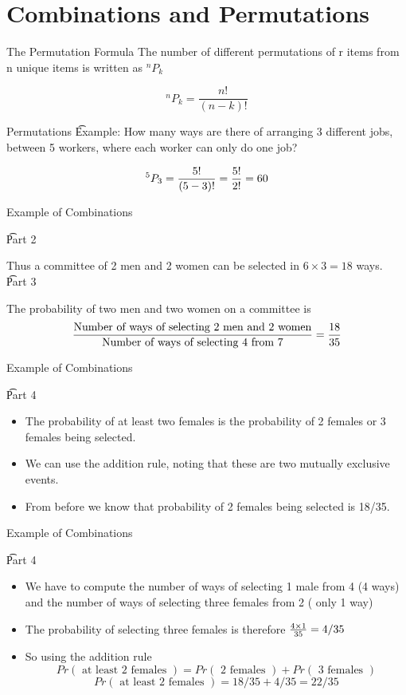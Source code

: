 \documentclass[]{report}
\begin{document}
	\section{ Combinations and Permutations }
	
		
{The Permutation Formula}
		The number of different permutations of r items from n unique items is written as $^n P_k$
		
		
		\[ ^n P_k = \frac{n!}{(n-k)!}\]

	{
		{Permutations}
		\t{Example:}
		How many ways are there of arranging 3 different jobs, between 5 workers, where each worker can only do one job?
		
		
		\[ ^5 P_3 = \frac{5!}{(5-3)!}  = {5! \over 2!} = 60\]
		

		{Example of Combinations}
		
		\t{Part 2}
		
		Thus a committee of 2 men and 2 women can be selected in $ 6 \times 3  = 18 $ ways.\\
		\bigskip
		\t{Part 3}
		
		The probability of two men and two women on a committee is
		\[ {\mbox{Number of ways of selecting 2 men and 2 women} \over \mbox{Number of ways of selecting 4 from 7}} = {18 \over 35 }\]
		
	
		{Example of Combinations}
		
		\t{Part 4}
		\begin{itemize}
			\item The probability of at least two females is the probability of 2 females or 3 females being selected.
			\item We can use the addition rule, noting that these are two mutually exclusive events.
			\item From before we know that probability of 2 females being selected is 18/35.
		\end{itemize}
		
	}
	{
		{Example of Combinations}
		
		\t{Part 4}
		\begin{itemize}
			\item We have to compute the number of ways of selecting 1 male from 4 (4 ways) and the number of ways of selecting three females from 2 ( only 1 way)
			\item The probability of selecting three females is therefore ${4 \times 1 \over 35} = 4/35$
			\item So using the addition rule
			\[ Pr(\mbox{ at least 2 females }) = Pr(\mbox{ 2 females }) + Pr(\mbox{ 3 females }) \]
			\[ Pr(\mbox{ at least 2 females })  = 18/35 + 4/35 = 22/35 \]
		\end{itemize}
		
	}
	
\end{document}
